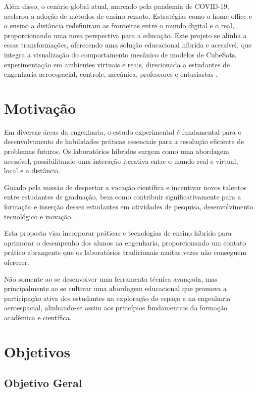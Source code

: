 Além disso, o cenário global atual, marcado pela pandemia de COVID-19, acelerou a adoção de métodos de ensino remoto. Estratégias como o home office e o ensino a distância redefiniram as fronteiras entre o mundo digital e o real, proporcionando uma nova perspectiva para a educação. Este projeto se alinha a essas transformações, oferecendo uma solução educacional híbrida e acessível, que integra a visualização do comportamento mecânico de modelos de CubeSats, experimentação em ambientes virtuais e reais, direcionada a estudantes de engenharia aeroespacial, controle, mecânica, professores e entusiastas \cite{bolu2020engineering}.


\section*{Motivação}\label{sec:Motivação}

Em diversas áreas da engenharia, o estudo experimental é fundamental para o desenvolvimento de habilidades práticas essenciais para a resolução eficiente de problemas futuros. Os laboratórios híbridos surgem como uma abordagem acessível, possibilitando uma interação iterativa entre o mundo real e virtual, local e a distância. 

Guiado pela missão de despertar a vocação científica e incentivar novos talentos entre estudantes de graduação, bem como contribuir significativamente para a formação e inserção desses estudantes em atividades de pesquisa, desenvolvimento tecnológico e inovação.

Esta proposta visa incorporar práticas e tecnologias de ensino híbrido para aprimorar o desempenho dos alunos na engenharia, proporcionando um contato prático abrangente que os laboratórios tradicionais muitas vezes não conseguem oferecer.

Não somente ao se desenvolver uma ferramenta técnica avançada, mas principalmente ao se cultivar uma abordagem educacional que promova a participação ativa dos estudantes na exploração do espaço e na engenharia aeroespacial, alinhando-se assim aos princípios fundamentais da formação acadêmica e científica.


\section*{Objetivos}\label{sec:objetivos}


\subsection*{Objetivo Geral}\label{sec:Objetivo Geral}

